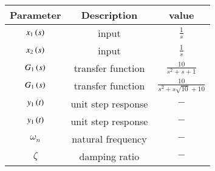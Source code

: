 \begin{tabular}{|c|c|c|}
	\hline
	\textbf{Parameter} &  \textbf{Description} & \textbf{value}\\[6pt]
	\hline
	$x_{1}\left(s\right)$ & input & $\frac{1}{s}$ \\[6pt]
	\hline
	$x_{2}\left(s\right)$ & input & $\frac{1}{s}$ \\[6pt]
	\hline
	$G_{1}\left(s\right)$ & transfer function & $\frac{10}{s^{2} + s + 1} $ \\[6pt]
	\hline
	$G_{1}\left(s\right)$ & transfer function & $\frac{10}{s^{2}+s\sqrt{10} +10} $ \\[6pt]
	\hline
	$y_{1}\left(t\right)$ & unit step response & $-$\\[6pt]
	\hline
	$y_{1}\left(t\right)$ & unit step response & $-$\\[6pt]
	\hline
	$\omega_{n}$ & natural frequency & $-$\\[6pt]
	\hline
	$\zeta$ & damping ratio & $-$\\[6pt]
	\hline 
	
\end{tabular}
